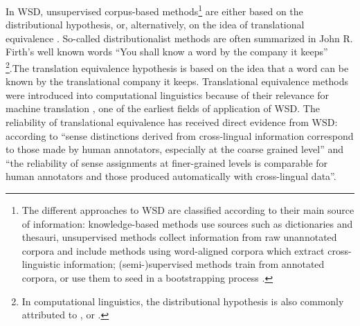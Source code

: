 In WSD, unsupervised corpus-based methods\footnote{The different approaches to WSD are classified according to their main source of information: knowledge-based methods use sources such as dictionaries and thesauri, unsupervised methods collect information from raw unannotated corpora and include methods using word-aligned corpora which extract cross-linguistic information; (semi-)supervised methods train from annotated corpora, or use them to seed in a bootstrapping process \citep[12]{agirre_word_2007}.} are either based on the distributional hypothesis, or, alternatively, on the idea of translational equivalence \citep{agirre_word_2007}. So-called distributionalist methods are often summarized in John R. Firth’s well known words “You shall know a word by the company it keeps” \citep[11]{firth_synopsis_1957}\footnote{In computational linguistics, the distributional hypothesis is also commonly attributed to \citet{anscombe_philosophical_1953}, \citet{harris_distributional_1954}  or \citet{weaver_translation_1955} \citep[142-143]{turney_frequency_2010}.}.The translation equivalence hypothesis is based on the idea that a word can be known by the translational company it keeps. Translational equivalence methods were introduced into computational linguistics because of their relevance for machine translation \citep[134]{agirre_unsupervised_2007}, one of the earliest fields of application of WSD. The reliability of translational equivalence has received direct evidence from WSD: according to \citet[1]{ide_automatic_2001} “sense distinctions derived from cross-lingual information correspond to those made by human annotators, especially at the coarse grained level” and “the reliability of sense assignments at finer-grained levels is comparable for human annotators and those produced automatically with cross-lingual data”.

